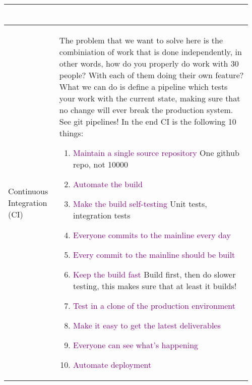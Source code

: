 \documentclass[main.tex,fontsize=8pt,paper=a4,paper=portrait,DIV=calc,]{scrartcl}
\begin{document}
\begin{table}[ht!]
\begin{tabular}{|m{0.2\linewidth}|m{0.755\linewidth}|}
\begin{lstlisting}
\end{lstlisting}\\
\hline
Continuous Integration (CI) & 
The problem that we want to solve here is the combiniation of work that is done independently, in other words, how do you properly do work with 30 people? With each of them doing their own feature?\newline
What we can do is define a pipeline which tests your work with the current state, making sure that no change will ever break the production system.\newline
See git pipelines!\newline
In the end CI is the following 10 things: \newline
\begin{enumerate}
\item \textcolor{purple}{Maintain a single source repository}\newline
  One github repo, not 10000
\item \textcolor{purple}{Automate the build}
\item \textcolor{purple}{Make the build self-testing} \newline
  Unit tests, integration tests
\item \textcolor{purple}{Everyone commits to the mainline every day}
\item \textcolor{purple}{Every commit to the mainline should be built}
\item \textcolor{purple}{Keep the build fast}\newline
  Build first, then do slower testing, this makes sure that at least it builds!
\item \textcolor{purple}{Test in a clone of the production environment}
\item \textcolor{purple}{Make it easy to get the latest deliverables}
\item \textcolor{purple}{Everyone can see what’s happening}
\item \textcolor{purple}{Automate deployment}
\vspace{-3mm}
\end{enumerate}\\
\hline
\end{tabular}
\end{table}
\pagebreak 
\end{document}
